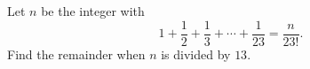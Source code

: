Let $n$ be the integer with
\[
1+\dfrac{1}{2}+\dfrac{1}{3}+\cdots+\dfrac{1}{23}=\dfrac{n}{23!}.
\]
Find the remainder when $n$ is divided by $13$.
